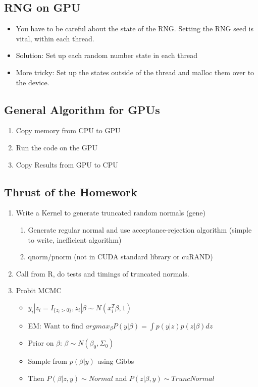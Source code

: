 \documentclass[12pt]{article}
\begin{document}
\subsection{RNG on GPU}
\begin{itemize}
\itemsep1pt\parskip0pt
\item You have to be careful about the state of the RNG. Setting the RNG seed is vital, within each thread.
\item Solution: Set up each random number state in each thread
\item More tricky: Set up the states outside of the thread and malloc them over to the device.
\end{itemize}

\subsection{General Algorithm for GPUs}
\begin{enumerate}
\def\labelenumi{\arabic{enumi}.}
\itemsep1pt\parskip0pt
\item Copy memory from CPU to GPU
\item Run the code on the GPU
\item Copy Results from GPU to CPU
\end{enumerate}

\subsection{Thrust of the Homework}
\begin{enumerate}
\def\labelenumi{\arabic{enumi}.}
\itemsep1pt\parskip0pt
\item Write a Kernel to generate truncated random normals (gene)

  \begin{enumerate}
  \def\labelenumii{\alph{enumii}.}
  \itemsep1pt\parskip0pt
  \item Generate regular normal and use acceptance-rejection algorithm (simple to write, inefficient algorithm)
  \item qnorm/pnorm (not in CUDA standard library or cuRAND)
  \end{enumerate}
\item Call from R, do tests and timings of truncated normals.
\item Probit MCMC

  \begin{itemize}
  \item $y_i | z_i = I_{\{z_i > 0\} }, z_i | \beta \sim N(x_i^T \beta, 1)$
  \item EM: Want to find $argmax_{\beta} P(y | \beta) = \int p(y|z) p(z | \beta) dz$
  \item Prior on $\beta$: $\beta \sim N( \beta_0, \Sigma_0)$
  \item Sample from $p(\beta | y)$ using Gibbs
  \item Then $P(\beta | z, y) \sim Normal$ and $P(z | \beta, y) \sim TruncNormal$
  \end{itemize}
\end{enumerate}
\end{document}
